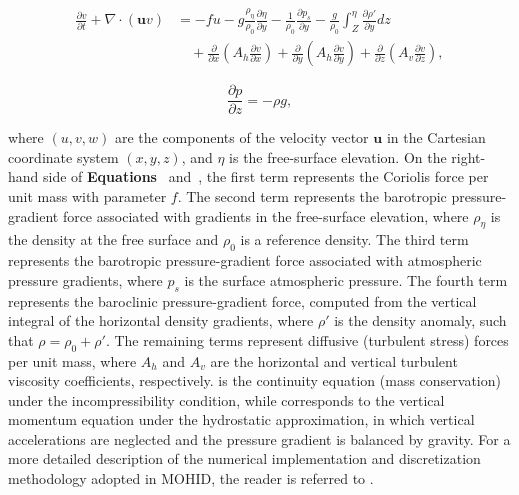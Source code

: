 \begin{equation}\label{eq:cp1_momentumymohid}
\begin{aligned}
    \frac{\partial v}{\partial t}
    + \nabla \cdot (\mathbf{u}v)
    &= -fu
    - g\frac{\rho_{\eta}}{\rho_0} \frac{\partial \eta}{\partial y}
    - \frac{1}{\rho_0}\frac{\partial p_s}{\partial y}
    - \frac{g}{\rho_0} \int_{Z}^{\eta}\frac{\partial \rho'}{\partial y} dz \\
    &\quad + \frac{\partial}{\partial x}\left( A_h \frac{\partial v}{\partial x}\right)
    + \frac{\partial}{\partial y}\left( A_h \frac{\partial v}{\partial y}\right)
    + \frac{\partial}{\partial z}\left( A_v \frac{\partial v}{\partial z}\right),
\end{aligned}
\end{equation}

\begin{equation}\label{eq:cp1_momentumzmohid}
    \frac{\partial p}{\partial z} = - \rho g,
\end{equation}

where $(u,v,w)$ are the components of the velocity vector $\mathbf{u}$ in the Cartesian coordinate system $(x,y,z)$, and $\eta$ is the free-surface elevation. On the right-hand side of \textbf{Equations}~ and~, the first term represents the Coriolis force per unit mass with parameter $f$. The second term represents the barotropic pressure-gradient force associated with gradients in the free-surface elevation, where $\rho_{\eta}$ is the density at the free surface and $\rho_0$ is a reference density. The third term represents the barotropic pressure-gradient force associated with atmospheric pressure gradients, where $p_s$ is the surface atmospheric pressure. The fourth term represents the baroclinic pressure-gradient force, computed from the vertical integral of the horizontal density gradients, where $\rho'$ is the density anomaly, such that $\rho = \rho_0 + \rho'$. The remaining terms represent diffusive (turbulent stress) forces per unit mass, where $A_h$ and $A_v$ are the horizontal and vertical turbulent viscosity coefficients, respectively.  is the continuity equation (mass conservation) under the incompressibility condition, while  corresponds to the vertical momentum equation under the hydrostatic approximation, in which vertical accelerations are neglected and the pressure gradient is balanced by gravity. For a more detailed description of the numerical implementation and discretization methodology adopted in MOHID, the reader is referred to \textcite{martins1998three}.

